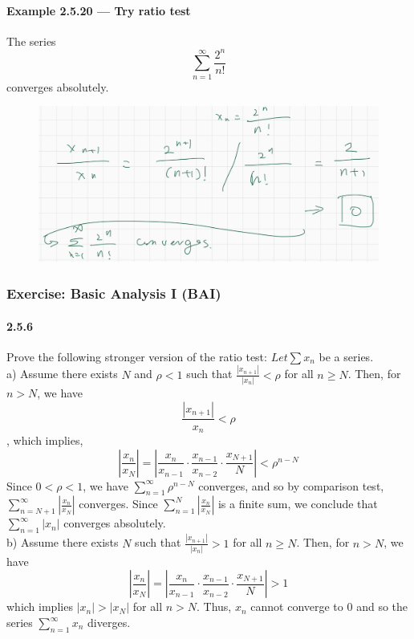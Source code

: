 \documentclass{article}
\begin{document}
\paragraph{Example 2.5.20 — Try ratio test}
The series $$\sum_{n=1}^{\infty}\frac{2^n}{n!}$$ converges absolutely.
\begin{figure}
    \centering
    \includegraphics{0147}
\end{figure}
\subsubsection{Exercise: Basic Analysis I (BAI)}
\paragraph{2.5.6}
Prove the following stronger version of the ratio test: $Let \sum x_n$ be a series.\\
a) Assume there exists $N$ and $\rho<1$ such that $\frac{|x_{n+1}|}{|x_n|}<\rho$ for all $n\geq N$. Then, for $n>N$, we have $$\frac{|x_{n+1}|}{x_n}<\rho$$,
which implies,
$$|\frac{x_n}{x_N}|=|\frac{x_n}{x_{n-1}}\cdot \frac{x_{n-1}}{x_{n-2}}\cdot \frac{x_{N+1}}{N}|<\rho^{n-N}$$
Since $0<\rho<1$, we have $\sum_{n=1}^{\infty}\rho^{n-N}$ converges, and so by comparison test, $\sum_{n=N+1}^{\infty}\left|\frac{x_n}{x_{N}}\right|$ converges. Since $\sum_{n=1}^{N}\left|\frac{x_n}{x_{N}}\right|$ is a finite sum, we conclude that $\sum_{n=1}^{\infty}|x_n|$ converges absolutely.\\
b) Assume there exists $N$ such that $\frac{|x_{n+1}|}{|x_n|}>1$ for all $n\ge N$. Then, for $n>N$, we have
$$|\frac{x_n}{x_N}|=|\frac{x_n}{x_{n-1}}\cdot \frac{x_{n-1}}{x_{n-2}}\cdot \frac{x_{N+1}}{N}|>1$$
which implies $\left|x_n\right|>\left|x_{N}\right|$ for all $n>N$. Thus, $x_n$ cannot converge to $0$ and so the series $\sum_{n=1}^{\infty} x_n$ diverges.
\end{document}
